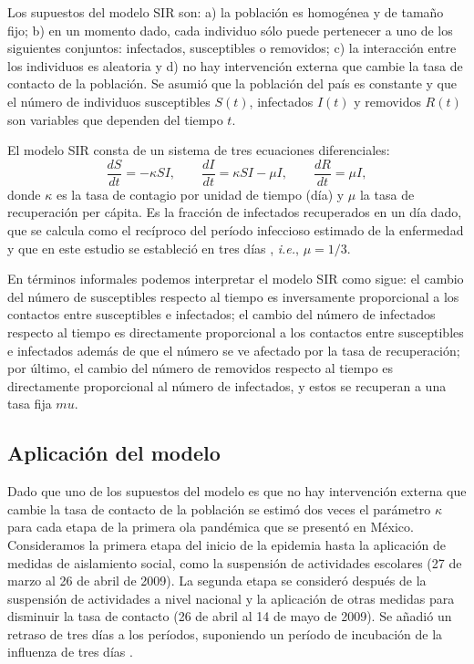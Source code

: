 \documentclass[12pt]{article}
\begin{document}
	Los supuestos del modelo SIR son: a) la población es homogénea y de tamaño fijo; b) en un momento dado, cada individuo sólo puede pertenecer a uno de los siguientes conjuntos: infectados, susceptibles o removidos; c) la interacción entre los individuos es aleatoria y d) no hay intervención externa que cambie la tasa de contacto de la población. Se asumió que la población del país es constante y que el número de individuos susceptibles $ S(t) $, infectados $ I(t) $ y removidos $ R(t) $ son variables que dependen del tiempo $ t $. 
	
	El modelo SIR consta de un sistema de tres ecuaciones diferenciales:
	\[ \frac{dS}{dt} = -\kappa S I, \qquad \frac{dI}{dt} = \kappa SI - \mu I, \qquad \frac{dR}{dt} = \mu I, \]
	donde $ \kappa $ es la tasa de contagio por unidad de tiempo (día) y $ \mu $ la tasa de recuperación per cápita. Es la fracción de infectados recuperados en un día dado, que se calcula como el recíproco del período infeccioso estimado de la enfermedad y que en este estudio se estableció en tres días \cite{Fielding2014}, \textit{i.e.}, $ \mu = 1/3 $.
	
	En términos informales podemos interpretar el modelo SIR como sigue: el cambio del número de susceptibles respecto al tiempo es inversamente proporcional a los contactos entre susceptibles e infectados; el cambio del número de infectados respecto al tiempo es directamente proporcional a los contactos entre susceptibles e infectados además de que el número se ve afectado por la tasa de recuperación; por último, el cambio del número de removidos respecto al tiempo es directamente proporcional al número de infectados, y estos se recuperan a una tasa fija $ mu $.
	
	\subsection*{Aplicación del modelo}
	
	Dado que uno de los supuestos del modelo es que no hay intervención externa que cambie la tasa de contacto de la población se estimó dos veces el parámetro $ \kappa $ para cada etapa de la primera ola pandémica que se presentó en México. Consideramos la primera etapa del inicio de la epidemia hasta la aplicación de medidas de aislamiento social, como la suspensión de actividades escolares (27 de marzo al 26 de abril de 2009). La segunda etapa se consideró después de la suspensión de actividades a nivel nacional y la aplicación de otras medidas para disminuir la tasa de contacto (26 de abril al 14 de mayo de 2009). Se añadió un retraso de tres días a los períodos, suponiendo un período de incubación de la influenza de tres días \cite{Fielding2014}.
	
\end{document}
